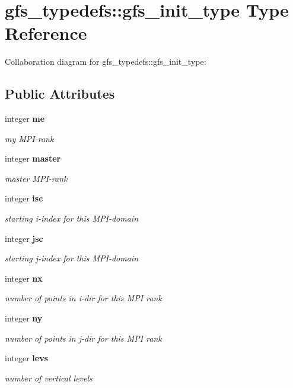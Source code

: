 \section{gfs\+\_\+typedefs\+:\+:gfs\+\_\+init\+\_\+type Type Reference}
\label{structgfs__typedefs_1_1gfs__init__type}


Collaboration diagram for gfs\+\_\+typedefs\+:\+:gfs\+\_\+init\+\_\+type\+:
\subsection*{Public Attributes}
\begin{DoxyCompactItemize}
\item 
integer \textbf{ me}
\begin{DoxyCompactList}\small\item\em my M\+P\+I-\/rank \end{DoxyCompactList}\item 
integer \textbf{ master}
\begin{DoxyCompactList}\small\item\em master M\+P\+I-\/rank \end{DoxyCompactList}\item 
integer \textbf{ isc}
\begin{DoxyCompactList}\small\item\em starting i-\/index for this M\+P\+I-\/domain \end{DoxyCompactList}\item 
integer \textbf{ jsc}
\begin{DoxyCompactList}\small\item\em starting j-\/index for this M\+P\+I-\/domain \end{DoxyCompactList}\item 
integer \textbf{ nx}
\begin{DoxyCompactList}\small\item\em number of points in i-\/dir for this M\+PI rank \end{DoxyCompactList}\item 
integer \textbf{ ny}
\begin{DoxyCompactList}\small\item\em number of points in j-\/dir for this M\+PI rank \end{DoxyCompactList}\item 
integer \textbf{ levs}
\begin{DoxyCompactList}\small\item\em number of vertical levels \end{DoxyCompactList}\item 

\end{DoxyCompactItemize}
